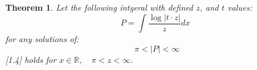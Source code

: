 \documentclass[10pt, twocolumn]{article}
\theoremstyle{plain}
\newtheorem{theorem}{Theorem}[section]
\theoremstyle{definition}
\theoremstyle{remark}
\begin{document}
\begin{theorem}
  Let the following intgeral with defined $z$, and $t$ values:
  \begin{equation}
    P = \int \frac{\log|t \cdot z|}{z} dx
  \end{equation}
  for any solutions of:
  \begin{equation}
    \:\:\pi< |P| <\infty 
  \end{equation}
  [1.4] holds for $x \in \mathbb{R}, \quad \pi < z < \infty$.
\end{theorem}
\nocite{*}



\end{document}
